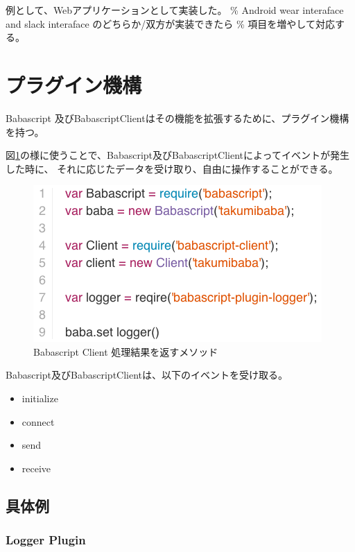 例として、Webアプリケーションとして実装した。 \% Android wear interaface
and slack interaface のどちらか/双方が実装できたら \%
項目を増やして対応する。

\section{プラグイン機構}\label{ux30d7ux30e9ux30b0ux30a4ux30f3ux6a5fux69cb}

Babascript
及びBabascriptClientはその機能を拡張するために、プラグイン機構を持つ。

図\ref{fig:babascript_plugin}の様に使うことで、Babascript及びBabascriptClientによってイベントが発生した時に、
それに応じたデータを受け取り、自由に操作することができる。

\begin{figure}[htbp]
  \begin{center}
  \includegraphics[width=.7\linewidth,bb=0 0 416 226]{images/babascript_plugin.js.png}
  \end{center}
  \caption{Babascript Client 処理結果を返すメソッド}
  \label{fig:babascript_plugin}
\end{figure}

Babascript及びBabascriptClientは、以下のイベントを受け取る。

\begin{itemize}
\itemsep1pt\parskip0pt
\item
  initialize
\item
  connect
\item
  send
\item
  receive
\end{itemize}

\subsection{具体例}\label{ux5177ux4f53ux4f8b}

\subsubsection{Logger Plugin}\label{logger-plugin}

